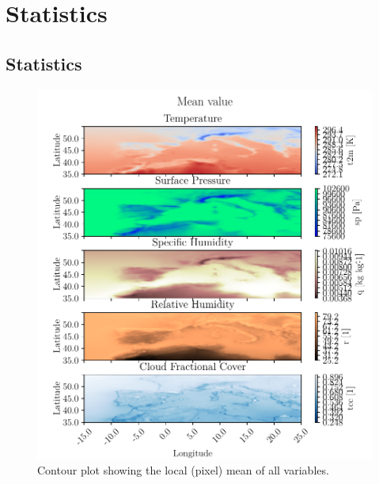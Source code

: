 \appendix
\chapter{Statistics}
\section{Statistics}
\begin{figure}[ht]
    \centering
    \includegraphics{python_figs/contourplot_all_variables_mean.pdf}
    \caption{Contour plot showing the local (pixel) mean of all variables.}
    \label{fig:contour_mean_all_vars}
\end{figure}


